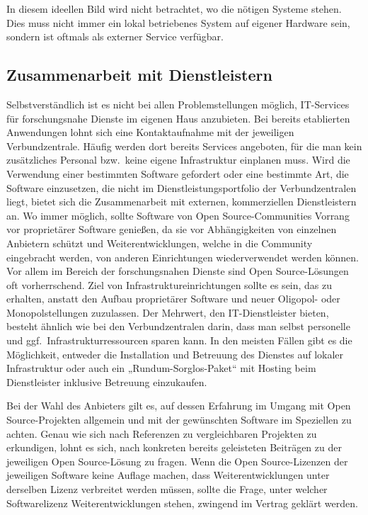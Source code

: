 \documentclass[
  11pt,
  letterpaper,
  DIV=11,
  twoside]{scrreprt}
\begin{document}
In diesem ideellen Bild wird nicht betrachtet, wo die nötigen Systeme
stehen. Dies muss nicht immer ein lokal betriebenes System auf eigener
Hardware sein, sondern ist oftmals als externer Service verfügbar.

\subsection{Zusammenarbeit mit
Dienstleistern}\label{zusammenarbeit-mit-dienstleistern}

Selbstverständlich ist es nicht bei allen Problemstellungen möglich,
IT-Services für forschungsnahe Dienste im eigenen Haus anzubieten. Bei
bereits etablierten Anwendungen lohnt sich eine Kontaktaufnahme mit der
jeweiligen Verbundzentrale. Häufig werden dort bereits Services
angeboten, für die man kein zusätzliches Personal bzw.~keine eigene
Infrastruktur einplanen muss. Wird die Verwendung einer bestimmten
Software gefordert oder eine bestimmte Art, die Software einzusetzen,
die nicht im Dienstleistungsportfolio der Verbundzentralen liegt, bietet
sich die Zusammenarbeit mit externen, kommerziellen Dienstleistern an.
Wo immer möglich, sollte Software von Open Source-Communities Vorrang
vor proprietärer Software genießen, da sie vor Abhängigkeiten von
einzelnen Anbietern schützt und Weiterentwicklungen, welche in die
Community eingebracht werden, von anderen Einrichtungen wiederverwendet
werden können. Vor allem im Bereich der forschungsnahen Dienste sind
Open Source-Lösungen oft vorherrschend. Ziel von
Infrastruktureinrichtungen sollte es sein, das zu erhalten, anstatt den
Aufbau proprietärer Software und neuer Oligopol- oder Monopolstellungen
zuzulassen. Der Mehrwert, den IT-Dienstleister bieten, besteht ähnlich
wie bei den Verbundzentralen darin, dass man selbst personelle und
ggf.~Infrastrukturressourcen sparen kann. In den meisten Fällen gibt es
die Möglichkeit, entweder die Installation und Betreuung des Dienstes
auf lokaler Infrastruktur oder auch ein „Rundum-Sorglos-Paket`` mit
Hosting beim Dienstleister inklusive Betreuung einzukaufen.

Bei der Wahl des Anbieters gilt es, auf dessen Erfahrung im Umgang mit
Open Source-Projekten allgemein und mit der gewünschten Software im
Speziellen zu achten. Genau wie sich nach Referenzen zu vergleichbaren
Projekten zu erkundigen, lohnt es sich, nach konkreten bereits
geleisteten Beiträgen zu der jeweiligen Open Source-Lösung zu fragen.
Wenn die Open Source-Lizenzen der jeweiligen Software keine Auflage
machen, dass Weiterentwicklungen unter derselben Lizenz verbreitet
werden müssen, sollte die Frage, unter welcher Softwarelizenz
Weiterentwicklungen stehen, zwingend im Vertrag geklärt werden.
\end{document}
